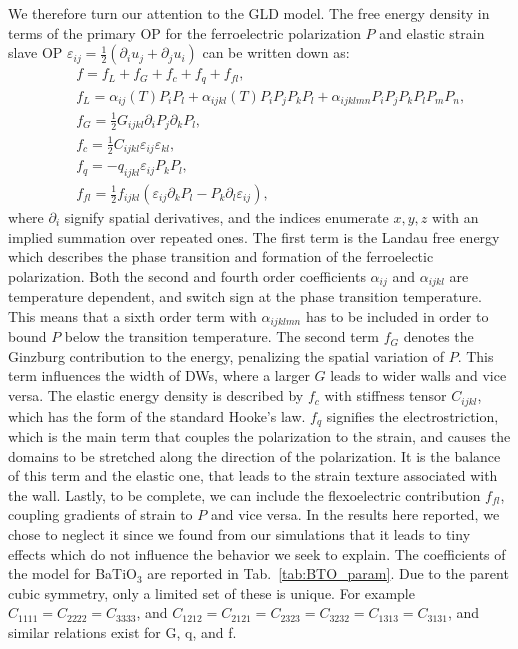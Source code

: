 We therefore turn our attention to the GLD model.
The free energy density in terms of the primary OP for the ferroelectric polarization $P$ and elastic strain slave OP $\varepsilon_{ij} = \frac{1}{2}(\partial_i u_j + \partial_j u_i)$ can be written down as:
\begin{eqnarray}\label{eq:BTO_energy}
&&f = f_{L}+f_{G}+f_{c}+f_{q}+f_{fl},\\
&&f_{L} = \alpha_{ij}(T)P_iP_l + \alpha_{ijkl}(T)P_{i}P_{j}P_{k}P_{l} + \alpha_{ijklmn} P_i P_j P_k P_l P_m P_n,\\
&&f_{G} = \frac{1}{2}G_{ijkl}\partial_i P_j\partial_k P_l,\\
&&f_{c} = \frac{1}{2}C_{ijkl}\varepsilon_{ij}\varepsilon_{kl},\\
&&f_{q}= - q_{ijkl}\varepsilon_{ij}P_{k}P_{l},\label{eq:qpp}\\
&&f_{fl}=\frac{1}{2}f_{ijkl}(\varepsilon_{ij}\partial_k P_l - P_k\partial_l\varepsilon_{ij}),
\end{eqnarray}
where $\partial_i$ signify spatial derivatives, and the indices enumerate ${x,y,z}$ with an implied summation over repeated ones.
The first term is the Landau free energy which describes the phase transition and formation of the ferroelectic polarization.
Both the second and fourth order coefficients $\alpha_{ij}$ and $\alpha_{ijkl}$ are temperature dependent, and switch sign at the phase transition temperature.
This means that a sixth order term with $\alpha_{ijklmn}$ has to be included in order to bound $P$ below the transition temperature.
The second term $f_G$ denotes the Ginzburg contribution to the energy, penalizing the spatial variation of $P$.  
This term influences the width of DWs, where a larger $G$ leads to wider walls and vice versa.
The elastic energy density is described by $f_c$ with stiffness tensor $C_{ijkl}$, which has the form of the standard Hooke's law.
$f_q$ signifies the electrostriction, which is the main term that couples the polarization to the strain, and causes the domains to be stretched along the direction of the polarization.
It is the balance of this term and the elastic one, that leads to the strain texture associated with the wall.
Lastly, to be complete, we can include the flexoelectric contribution $f_{fl}$, coupling gradients of strain to $P$ and vice versa.
In the results here reported, we chose to neglect it since we found from our simulations that it leads to tiny effects which do not influence the behavior we seek to explain.
The coefficients of the model for BaTiO$_3$ are reported in Tab.~\ref{tab:BTO_param}.
Due to the parent cubic symmetry, only a limited set of these is unique.
For example $C_{1111} = C_{2222} = C_{3333}$, and $C_{1212} = C_{2121} = C_{2323} = C_{3232} = C_{1313} = C_{3131}$, and similar relations exist for G, q, and f. 

